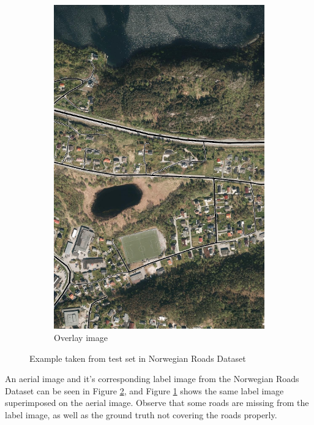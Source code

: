 \begin{figure}
\begin{subfigure}{0.32\textwidth}
\includegraphics[width=\linewidth]{figs/datasets/Norwegian_roads_overlay_example2.png}
\caption{Overlay image} \label{fig:norwegian_roads_example_overlay}
\end{subfigure}
\hspace*{\fill} %
\caption{Example taken from test set in Norwegian Roads Dataset} \label{fig:norwegian_roads_example}
\end{figure}

An aerial image and it's corresponding label image from the Norwegian Roads Dataset can be seen in Figure \ref{fig:norwegian_roads_example}, and Figure \ref{fig:norwegian_roads_example_overlay} shows the same label image superimposed on the aerial image. Observe that some roads are missing from the label image, as well as the ground truth not covering the roads properly. \\
